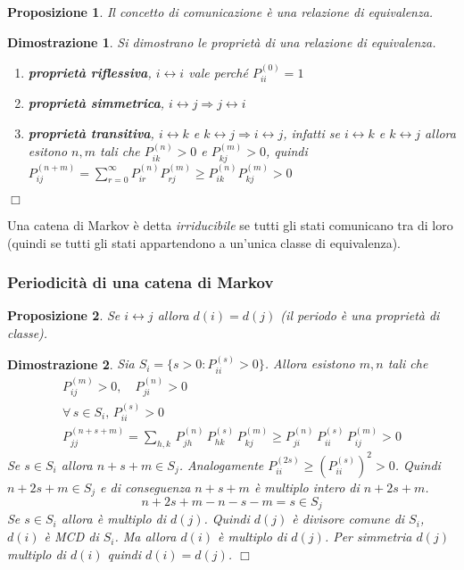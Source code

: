 \documentclass{article}
\newtheorem{proposizione}{Proposizione}[section]
\newtheorem*{dimostrazione*}{Dimostrazione}
\newcommand*{\QED}{\hfill\ensuremath{\Box}}
\begin{document}
\begin{proposizione}
Il concetto di \textit{comunicazione} è una relazione di equivalenza.
\end{proposizione}
\begin{dimostrazione*}
Si dimostrano le proprietà di una relazione di equivalenza.
\begin{enumerate}
    \item \textbf{proprietà riflessiva}, $i \leftrightarrow i$ vale perché $P_{ii}^{(0)} = 1$
    \item \textbf{proprietà simmetrica}, $i \leftrightarrow j \Rightarrow j \leftrightarrow i$
    \item \textbf{proprietà transitiva}, $i \leftrightarrow k$ e $k \leftrightarrow j \Rightarrow i \leftrightarrow j$, infatti se $i \leftrightarrow k$ e $k \leftrightarrow j$ allora esitono $n,m$ tali che $P_{ik}^{(n)} > 0$ e $P_{kj}^{(m)} > 0$, quindi $P_{ij}^{(n+m)} = \sum_{r=0}^{\infty} P_{ir}^{(n)}P_{rj}^{(m)} \ge P_{ik}^{(n)}P_{kj}^{(m)} > 0$
\end{enumerate}
\QED
\end{dimostrazione*}
Una catena di Markov è detta \textit{irriducibile} se tutti gli stati comunicano tra di loro (quindi se tutti gli stati appartendono a un'unica classe di equivalenza).

\subsubsection{Periodicità di una catena di Markov}

\begin{proposizione}
\label{mc_periodo_prop_classe}
Se $i \leftrightarrow j$ allora $d(i) = d(j)$ (il periodo è una proprietà di classe).
\end{proposizione}
\begin{dimostrazione*}
Sia $S_i = \{s > 0 : P_{ii}^{(s)} > 0\}$. Allora esistono $m,n$ tali che
\begin{gather*}
P_{ij}^{(m)} > 0,\quad P_{ji}^{(n)} > 0\\
\forall\,s \in S_i,\, P_{ii}^{(s)} > 0\\
P_{jj}^{(n+s+m)} = \sum_{h,k}\,P_{jh}^{(n)}\,P_{hk}^{(s)}\,P_{kj}^{(m)} \ge P_{ji}^{(n)}\,P_{ii}^{(s)}\,P_{ij}^{(m)} > 0
\end{gather*}
Se $s \in S_i$ allora $n + s + m \in S_j$. Analogamente $P_{ii}^{(2s)} \ge (P_{ii}^{(s)})^2 > 0$. Quindi $n+2s+m \in S_j$ e di conseguenza $n+s+m$ è multiplo intero di $n+2s+m$.
$$
n+2s+m -n-s-m = s \in S_j
$$
Se $s \in S_i$ allora è multiplo di $d(j)$. Quindi $d(j)$ è divisore comune di $S_i$, $d(i)$ è MCD di $S_i$. Ma allora $d(i)$ è multiplo di $d(j)$. Per simmetria $d(j)$ multiplo di $d(i)$ quindi $d(i) = d(j)$.
\QED
\end{dimostrazione*}
\end{document}

